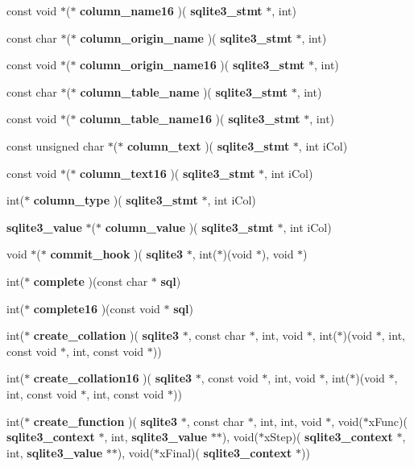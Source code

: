 \begin{DoxyCompactItemize}
\item 
const void $\ast$($\ast$ \textbf{ column\+\_\+name16} )(\textbf{ sqlite3\+\_\+stmt} $\ast$, int)
\item 
const char $\ast$($\ast$ \textbf{ column\+\_\+origin\+\_\+name} )(\textbf{ sqlite3\+\_\+stmt} $\ast$, int)
\item 
const void $\ast$($\ast$ \textbf{ column\+\_\+origin\+\_\+name16} )(\textbf{ sqlite3\+\_\+stmt} $\ast$, int)
\item 
const char $\ast$($\ast$ \textbf{ column\+\_\+table\+\_\+name} )(\textbf{ sqlite3\+\_\+stmt} $\ast$, int)
\item 
const void $\ast$($\ast$ \textbf{ column\+\_\+table\+\_\+name16} )(\textbf{ sqlite3\+\_\+stmt} $\ast$, int)
\item 
const unsigned char $\ast$($\ast$ \textbf{ column\+\_\+text} )(\textbf{ sqlite3\+\_\+stmt} $\ast$, int i\+Col)
\item 
const void $\ast$($\ast$ \textbf{ column\+\_\+text16} )(\textbf{ sqlite3\+\_\+stmt} $\ast$, int i\+Col)
\item 
int($\ast$ \textbf{ column\+\_\+type} )(\textbf{ sqlite3\+\_\+stmt} $\ast$, int i\+Col)
\item 
\textbf{ sqlite3\+\_\+value} $\ast$($\ast$ \textbf{ column\+\_\+value} )(\textbf{ sqlite3\+\_\+stmt} $\ast$, int i\+Col)
\item 
void $\ast$($\ast$ \textbf{ commit\+\_\+hook} )(\textbf{ sqlite3} $\ast$, int($\ast$)(void $\ast$), void $\ast$)
\item 
int($\ast$ \textbf{ complete} )(const char $\ast$\textbf{ sql})
\item 
int($\ast$ \textbf{ complete16} )(const void $\ast$\textbf{ sql})
\item 
int($\ast$ \textbf{ create\+\_\+collation} )(\textbf{ sqlite3} $\ast$, const char $\ast$, int, void $\ast$, int($\ast$)(void $\ast$, int, const void $\ast$, int, const void $\ast$))
\item 
int($\ast$ \textbf{ create\+\_\+collation16} )(\textbf{ sqlite3} $\ast$, const void $\ast$, int, void $\ast$, int($\ast$)(void $\ast$, int, const void $\ast$, int, const void $\ast$))
\item 
int($\ast$ \textbf{ create\+\_\+function} )(\textbf{ sqlite3} $\ast$, const char $\ast$, int, int, void $\ast$, void($\ast$x\+Func)(\textbf{ sqlite3\+\_\+context} $\ast$, int, \textbf{ sqlite3\+\_\+value} $\ast$$\ast$), void($\ast$x\+Step)(\textbf{ sqlite3\+\_\+context} $\ast$, int, \textbf{ sqlite3\+\_\+value} $\ast$$\ast$), void($\ast$x\+Final)(\textbf{ sqlite3\+\_\+context} $\ast$))

\end{DoxyCompactItemize}
